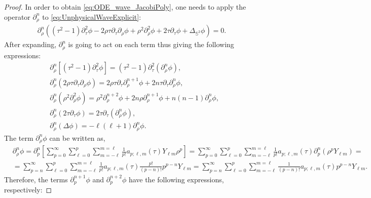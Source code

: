\begin{proof}
In order to obtain \eqref{eq:ODE_wave_JacobiPoly}, one needs to apply the operator $\partial_{\rho}^{n}$ to \eqref{eq:UnphysicalWaveExplicit}:
\begin{align}\label{eq:ODE_wave_JacobiPolytransformed}
  \partial_{\rho}^{n}\left(\left(\tau^2-1\right) \partial_\tau^2 \phi-2 \rho \tau \partial_\tau \partial_\rho \phi+\rho^2 \partial_\rho^2 \phi+2 \tau \partial_\tau \phi+\Delta_{\mathbb{S}^2} \phi\right)=0.
\end{align}
After expanding, $\partial_{\rho}^{n}$ is going to act on each term thus giving the following expressions:
\begin{align}\label{eq:operatorexpressions}
  & \partial_{\rho}^{n}\left[\left(\tau^{2}-1\right) \partial_{\tau}^{2} \phi\right]=\left(\tau^{2}-1\right) \partial_{\tau}^{2}\left(\partial_{\rho}^{n} \phi\right), \\
  & \partial_{\rho}^{n}\left(2 \rho \tau \partial_{\tau} \partial_{\rho} \phi\right)=2 \rho \tau \partial_{\tau} \partial_{\rho}^{n+1} \phi+2 n \tau \partial_{\tau} \partial_{\rho}^{n} \phi, \\
  & \partial_{\rho}^{n}\left(\rho^{2} \partial_{\rho}^{2} \phi\right)=\rho^{2} \partial_{\rho}^{n+2} \phi+2 n \rho \partial_{\rho}^{n+1} \phi+n(n-1) \partial_{\rho}^{n} \phi, \\
  & \partial_{\rho}^{n}\left(2 \tau \partial_{\tau} \phi\right)=2 \tau \partial_{\tau}\left(\partial_{\rho}^{n} \phi\right), \\
  & \partial_{\rho}^{n}(\Delta \phi)=-\ell(\ell+1) \partial_{\rho}^{n} \phi.
\end{align}
The term $\partial_{\rho}^{n} \phi$ can be written as,
\begin{align}\label{eq:operator_phi}
  & \partial_{\rho}^{n} \phi=\partial_{p}^{n}\left[\sum_{p=0}^{\infty} \sum_{\ell=0}^{p} \sum_{m=-\ell}^{m=\ell} \frac{1}{p !} a_{p;\ell, m}(\tau) Y_{\ell m} \rho^{p}\right]= \sum_{p=0}^{\infty} \sum_{\ell=0}^{p} \sum_{m=-\ell}^{m=\ell} \frac{1}{p !} a_{p; \ell, m}(\tau) \partial_{p}^{n}\left(\rho^{p} Y_{\ell m}\right)= \nonumber \\
  & =\sum_{p=n}^{\infty} \sum_{\ell=0}^{p} \sum_{m=-\ell}^{m=\ell} \frac{1}{p !} a_{p;\ell,m}(\tau) \frac{p !}{(p-n) !} p^{p-n} Y_{\ell m} = \sum_{p=n}^{\infty} \sum_{\ell=0}^{p} \sum_{m=-\ell}^{m=\ell} \frac{1}{(p-n) !} a_{p;\ell,m}(\tau) p^{p-n} Y_{\ell m}.
\end{align}
Therefore, the terms $\partial_{p}^{n+1} \phi$ and $\partial_{p}^{n+2} \phi$ have the following expressions, respectively:

\end{proof}
